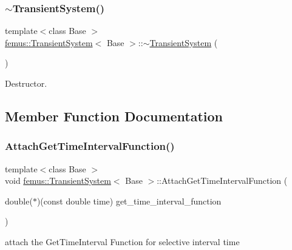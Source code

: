 \subsubsection{\texorpdfstring{$\sim$\+Transient\+System()}{~TransientSystem()}}
{\footnotesize\ttfamily template$<$class Base $>$ \\
\mbox{\hyperlink{classfemus_1_1_transient_system}{femus\+::\+Transient\+System}}$<$ Base $>$\+::$\sim$\mbox{\hyperlink{classfemus_1_1_transient_system}{Transient\+System}} (\begin{DoxyParamCaption}{ }\end{DoxyParamCaption})\hspace{0.3cm}{\ttfamily [virtual]}}

Destructor. 

\subsection{Member Function Documentation}
\mbox{\label{classfemus_1_1_transient_system_a460cb5896e2ca0023ea98ac242cae61e}} 
\subsubsection{\texorpdfstring{Attach\+Get\+Time\+Interval\+Function()}{AttachGetTimeIntervalFunction()}}
{\footnotesize\ttfamily template$<$class Base $>$ \\
void \mbox{\hyperlink{classfemus_1_1_transient_system}{femus\+::\+Transient\+System}}$<$ Base $>$\+::Attach\+Get\+Time\+Interval\+Function (\begin{DoxyParamCaption}\item[{double($\ast$)(const double time)}]{get\+\_\+time\+\_\+interval\+\_\+function }\end{DoxyParamCaption})}

attach the Get\+Time\+Interval Function for selective interval time \mbox{\label{classfemus_1_1_transient_system_a2be721088a3cb75315505b89e7469fdf}} 
